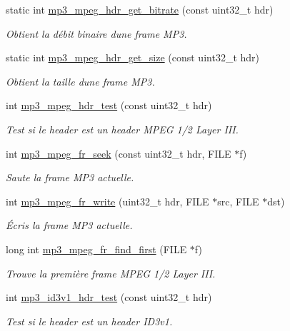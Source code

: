 \begin{DoxyCompactItemize}
static int \hyperlink{a00086_aa48df36af23103ce104d13854d4cbb87}{mp3\+\_\+mpeg\+\_\+hdr\+\_\+get\+\_\+bitrate} (const uint32\+\_\+t hdr)
\begin{DoxyCompactList}\small\item\em Obtient la débit binaire d\textquotesingle{}une frame M\+P3. \end{DoxyCompactList}\item 
static int \hyperlink{a00086_a3f5f1c770ad5013ccf94bce56b7d0a04}{mp3\+\_\+mpeg\+\_\+hdr\+\_\+get\+\_\+size} (const uint32\+\_\+t hdr)
\begin{DoxyCompactList}\small\item\em Obtient la taille d\textquotesingle{}une frame M\+P3. \end{DoxyCompactList}\item 
int \hyperlink{a00086_a75bc8b052a4d00ab95b05b576918360d}{mp3\+\_\+mpeg\+\_\+hdr\+\_\+test} (const uint32\+\_\+t hdr)
\begin{DoxyCompactList}\small\item\em Test si le header est un header M\+P\+EG 1/2 Layer I\+II. \end{DoxyCompactList}\item 
int \hyperlink{a00086_aee166f42b332d8c5b51d25a9ef8c14b7}{mp3\+\_\+mpeg\+\_\+fr\+\_\+seek} (const uint32\+\_\+t hdr, F\+I\+LE $\ast$f)
\begin{DoxyCompactList}\small\item\em Saute la frame M\+P3 actuelle. \end{DoxyCompactList}\item 
int \hyperlink{a00086_ab0198bd0d67c778ff7493f1bcd0a409e}{mp3\+\_\+mpeg\+\_\+fr\+\_\+write} (uint32\+\_\+t hdr, F\+I\+LE $\ast$src, F\+I\+LE $\ast$dst)
\begin{DoxyCompactList}\small\item\em Écris la frame M\+P3 actuelle. \end{DoxyCompactList}\item 
long int \hyperlink{a00086_afc3c44f7f4f0993fbc17c150c728e677}{mp3\+\_\+mpeg\+\_\+fr\+\_\+find\+\_\+first} (F\+I\+LE $\ast$f)
\begin{DoxyCompactList}\small\item\em Trouve la première frame M\+P\+EG 1/2 Layer I\+II. \end{DoxyCompactList}\item 
int \hyperlink{a00086_aaccf359620da01d34de43ba7ce7f3513}{mp3\+\_\+id3v1\+\_\+hdr\+\_\+test} (const uint32\+\_\+t hdr)
\begin{DoxyCompactList}\small\item\em Test si le header est un header I\+D3v1. \end{DoxyCompactList}\item 

\end{DoxyCompactItemize}
